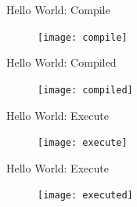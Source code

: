\documentclass[xcolor={dvipsnames}]{beamer}
\begin{document}
\begin{frame}{Hello World: Compile}
	\begin{figure}
			\texttt{[image: compile]}
	\end{figure}
\end{frame}

\begin{frame}{Hello World: Compiled}
	\begin{figure}
			\texttt{[image: compiled]}
	\end{figure}
\end{frame}

\begin{frame}{Hello World: Execute}
	\begin{figure}
			\texttt{[image: execute]}
	\end{figure}
\end{frame}

\begin{frame}{Hello World: Execute}
	\begin{figure}
			\texttt{[image: executed]}
	\end{figure}
\end{frame}
\end{document}
